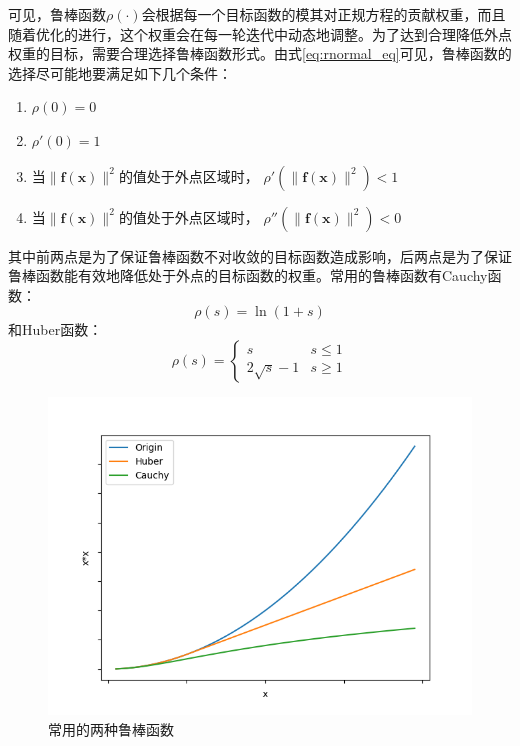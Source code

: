 可见，鲁棒函数$\rho(\cdot)$会根据每一个目标函数的模其对正规方程的贡献权重，而且随着优化的进行，这个权重会在每一轮迭代中动态地调整。为了达到合理降低外点权重的目标，需要合理选择鲁棒函数形式。由式\eqref{eq:rnormal_eq}可见，鲁棒函数的选择尽可能地要满足如下几个条件\citep{triggs1999bundle,zhang1995parameter}：
\begin{enumerate}
    \item $\rho(0)=0$
    \item $\rho'(0)=1$
    \item 当$\lVert\bm{f}(\bm{x})\rVert^2$的值处于外点区域时，
          $\rho'(\lVert\bm{f}(\bm{x})\rVert^2)<1$
    \item 当$\lVert\bm{f}(\bm{x})\rVert^2$的值处于外点区域时，
          $\rho''(\lVert\bm{f}(\bm{x})\rVert^2)<0$
\end{enumerate}
其中前两点是为了保证鲁棒函数不对收敛的目标函数造成影响，后两点是为了保证鲁棒函数能有效地降低处于外点的目标函数的权重。常用的鲁棒函数有Cauchy函数：
\begin{equation}
    \rho(s) = \ln(1+s)
\end{equation}
和Huber函数：
\begin{equation}
    \rho(s) =
    \left\{
    \begin{array}{ll}
        s & s \leq 1 \\
        2\sqrt{s}-1 & s \geq 1
    \end{array}
    \right.
\end{equation}

\begin{figure}[htb!]
    \centering
    \includegraphics[width=.8\textwidth]{figs/robust.png}
    \caption{常用的两种鲁棒函数}
    \label{fig:robust}
\end{figure}
